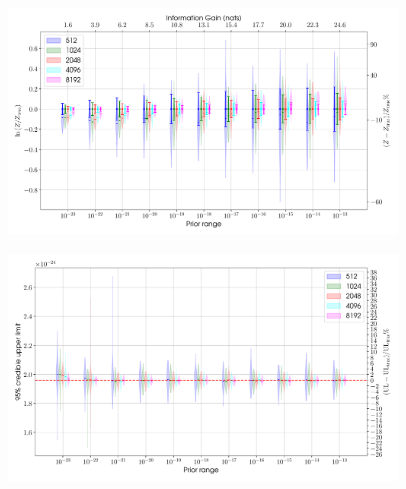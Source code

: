 \begin{figure}[phtb]
\begin{center}
\includegraphics[width=0.92\textwidth]{./figures/proptesting/walk_uniform_prop/evidences/collate_plots_wup_evidences}
\caption{ \protect}
\end{center}
\end{figure}


\begin{figure}[phtb]
\begin{center}
\includegraphics[width=0.92\textwidth]{./figures/proptesting/walk_uniform_prop/upperlimits/collate_plots_wup_uls}
\caption{ \protect}
\end{center}
\end{figure}


